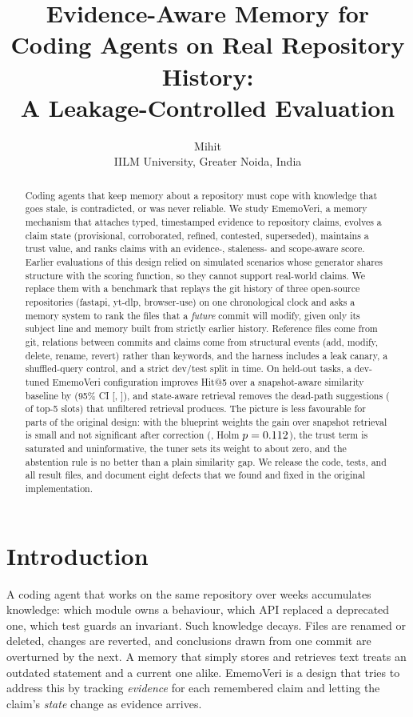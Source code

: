 \documentclass[11pt,a4paper]{article}
\title{Evidence-Aware Memory for Coding Agents on Real Repository History:\\ A Leakage-Controlled Evaluation}
\author{Mihit\\ \small IILM University, Greater Noida, India}
\date{}
\newcommand{\sys}{EmemoVeri}
\begin{document}
\maketitle

\begin{abstract}
Coding agents that keep memory about a repository must cope with knowledge that goes stale, is contradicted, or was never reliable. We study \sys{}, a memory mechanism that attaches typed, timestamped evidence to repository claims, evolves a claim state (provisional, corroborated, refined, contested, superseded), maintains a trust value, and ranks claims with an evidence-, staleness- and scope-aware score. Earlier evaluations of this design relied on simulated scenarios whose generator shares structure with the scoring function, so they cannot support real-world claims. We replace them with a benchmark that replays the git history of three open-source repositories (fastapi, yt-dlp, browser-use) on one chronological clock and asks a memory system to rank the files that a \emph{future} commit will modify, given only its subject line and memory built from strictly earlier history. Reference files come from git, relations between commits and claims come from structural events (add, modify, delete, rename, revert) rather than keywords, and the harness includes a leak canary, a shuffled-query control, and a strict dev/test split in time. On \nTest{} held-out tasks, a dev-tuned \sys{} configuration improves Hit@5 over a snapshot-aware similarity baseline by \dTunedSnapFive{} (95\% CI [\dTunedSnapLo{}, \dTunedSnapHi{}]), and state-aware retrieval removes the dead-path suggestions (\deadPlain{} of top-5 slots) that unfiltered retrieval produces. The picture is less favourable for parts of the original design: with the blueprint weights the gain over snapshot retrieval is small and not significant after correction (\dEmvSnapFive{}, Holm $p=0.112{}$), the trust term is saturated and uninformative, the tuner sets its weight to about zero, and the abstention rule is no better than a plain similarity gap. We release the code, tests, and all result files, and document eight defects that we found and fixed in the original implementation.
\end{abstract}

\section{Introduction}
A coding agent that works on the same repository over weeks accumulates knowledge: which module owns a behaviour, which API replaced a deprecated one, which test guards an invariant. Such knowledge decays. Files are renamed or deleted, changes are reverted, and conclusions drawn from one commit are overturned by the next. A memory that simply stores and retrieves text treats an outdated statement and a current one alike. \sys{} is a design that tries to address this by tracking \emph{evidence} for each remembered claim and letting the claim's \emph{state} change as evidence arrives.
\end{document}
